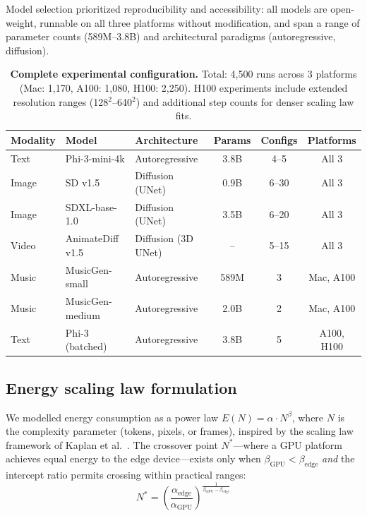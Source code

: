 \documentclass[preprint,12pt]{elsarticle}
\begin{document}
Model selection prioritized reproducibility and accessibility: all models are open-weight, runnable on all three platforms without modification, and span a range of parameter counts (589M--3.8B) and architectural paradigms (autoregressive, diffusion).

\begin{table}[t]
\centering
\caption{\textbf{Complete experimental configuration.} Total: 4,500 runs across 3 platforms (Mac: 1,170, A100: 1,080, H100: 2,250). H100 experiments include extended resolution ranges (128$^2$--640$^2$) and additional step counts for denser scaling law fits.}
\label{tab:models_detail}
\small
\begin{tabular}{@{}lllccc@{}}
\toprule
\textbf{Modality} & \textbf{Model} & \textbf{Architecture} & \textbf{Params} & \textbf{Configs} & \textbf{Platforms} \\
\midrule
Text & Phi-3-mini-4k & Autoregressive & 3.8B & 4--5 & All 3 \\
Image & SD v1.5 & Diffusion (UNet) & 0.9B & 6--30 & All 3 \\
Image & SDXL-base-1.0 & Diffusion (UNet) & 3.5B & 6--20 & All 3 \\
Video & AnimateDiff v1.5 & Diffusion (3D UNet) & -- & 5--15 & All 3 \\
Music & MusicGen-small & Autoregressive & 589M & 3 & Mac, A100 \\
Music & MusicGen-medium & Autoregressive & 2.0B & 2 & Mac, A100 \\
Text & Phi-3 (batched) & Autoregressive & 3.8B & 5 & A100, H100 \\
\bottomrule
\end{tabular}
\end{table}

\subsection{Energy scaling law formulation}

We modelled energy consumption as a power law $E(N) = \alpha \cdot N^\beta$, where $N$ is the complexity parameter (tokens, pixels, or frames), inspired by the scaling law framework of Kaplan et al.~\cite{kaplan2020scaling}. The crossover point $N^*$---where a GPU platform achieves equal energy to the edge device---exists only when $\beta_\text{GPU} < \beta_\text{edge}$ \textit{and} the intercept ratio permits crossing within practical ranges:
\begin{equation}
N^* = \left(\frac{\alpha_\text{edge}}{\alpha_\text{GPU}}\right)^{\frac{1}{\beta_\text{GPU} - \beta_\text{edge}}}
\end{equation}
\end{document}
